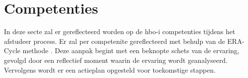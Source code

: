 \section{Competenties}
In deze secte zal er gereflecteerd worden op de hbo-i \parencite{HBOICompetenties} competenties tijdens het afstudeer process.
Er zal per competenite gereflecteerd met behulp van de ERA-Cycle methode \parencite{BeginningReflectivePractice}.
Deze aanpak begint met een beknopte schets van de ervaring, gevolgd door een reflectief moment waarin de ervaring wordt geanalyseerd.
Vervolgens wordt er een actieplan opgesteld voor toekomstige stappen.







